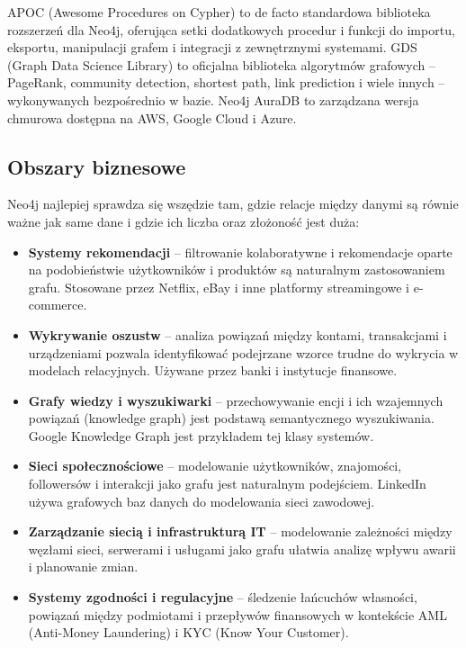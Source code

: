 APOC (Awesome Procedures on Cypher) to de facto standardowa biblioteka
rozszerzeń dla Neo4j, oferująca setki dodatkowych procedur i funkcji do
importu, eksportu, manipulacji grafem i integracji z zewnętrznymi systemami.
GDS (Graph Data Science Library) to oficjalna biblioteka algorytmów grafowych
-- PageRank, community detection, shortest path, link prediction i wiele
innych -- wykonywanych bezpośrednio w bazie. Neo4j AuraDB to zarządzana
wersja chmurowa dostępna na AWS, Google Cloud i Azure.

\subsection{Obszary biznesowe}

Neo4j najlepiej sprawdza się wszędzie tam, gdzie relacje między danymi są
równie ważne jak same dane i gdzie ich liczba oraz złożoność jest duża:

\begin{itemize}
    \item \textbf{Systemy rekomendacji} -- filtrowanie kolaboratywne
    i rekomendacje oparte na podobieństwie użytkowników i produktów są
    naturalnym zastosowaniem grafu. Stosowane przez Netflix, eBay i inne
    platformy streamingowe i e-commerce.
    \item \textbf{Wykrywanie oszustw} -- analiza powiązań między kontami,
    transakcjami i urządzeniami pozwala identyfikować podejrzane wzorce
    trudne do wykrycia w modelach relacyjnych. Używane przez banki
    i instytucje finansowe.
    \item \textbf{Grafy wiedzy i wyszukiwarki} -- przechowywanie encji
    i ich wzajemnych powiązań (knowledge graph) jest podstawą semantycznego
    wyszukiwania. Google Knowledge Graph jest przykładem tej klasy systemów.
    \item \textbf{Sieci społecznościowe} -- modelowanie użytkowników,
    znajomości, followersów i interakcji jako grafu jest naturalnym
    podejściem. LinkedIn używa grafowych baz danych do modelowania sieci
    zawodowej.
    \item \textbf{Zarządzanie siecią i infrastrukturą IT} -- modelowanie
    zależności między węzłami sieci, serwerami i usługami jako grafu
    ułatwia analizę wpływu awarii i planowanie zmian.
    \item \textbf{Systemy zgodności i regulacyjne} -- śledzenie łańcuchów
    własności, powiązań między podmiotami i przepływów finansowych
    w kontekście AML (Anti-Money Laundering) i KYC (Know Your Customer).
\end{itemize}

